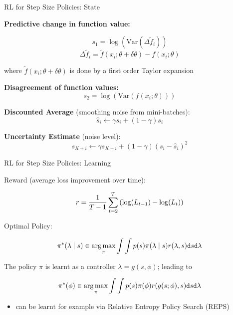 \begin{frame}[c]{RL for Step Size Policies: State }

\textbf{Predictive change in function value:}

$$s_1 = \log \left( \text{Var}(\Delta \tilde{f}_i ) \right)$$
$$\Delta \tilde{f}_i = \tilde{f}(x_i; \theta + \delta \theta) - f(x_i; \theta)$$

where $\tilde{f}(x_i; \theta + \delta \theta)$ is done by a first order Taylor expansion

\pause
\textbf{Disagreement of function values:}
$$ s_2 = \log \left(\text{Var}(f(x_i; \theta)) \right)$$

\pause

\textbf{Discounted Average} (smoothing noise from mini-batches):
$$\hat{s}_i \leftarrow \gamma \hat{s_i} + (1 - \gamma) s_i$$

\pause

\textbf{Uncertainty Estimate} (noise level):
$$s_{K+i} \leftarrow \gamma s_{K+i} + (1-\gamma) (s_i - \hat{s}_i)^2$$


\end{frame}
\begin{frame}[c]{RL for Step Size Policies: Learning }

Reward (average loss improvement over time):

$$r = \frac{1}{T-1} \sum_{t=2}^T \left(\log(L_{t-1}) - \log(L_t)\right)$$

\pause

Optimal Policy:

$$\pi^*(\lambda \mid s) \in \operatorname*{arg\,max}_{\pi} \int \int p(s) \pi(\lambda\mid s)r(\lambda,s) \texttt{d}s \texttt{d}\lambda $$

\pause

The policy $\pi$ is learnt as a controller $\lambda = g(s, \phi)$; leading to

$$\pi^*(\phi) \in \operatorname*{arg\,max}_{\pi} \int \int p(s) \pi(\phi)r(g(s;\phi),s) \texttt{d}s \texttt{d}\lambda $$

\pause

\begin{itemize}
\item can be learnt for example via Relative Entropy Policy Search (REPS) 
\end{itemize}

\end{frame}
